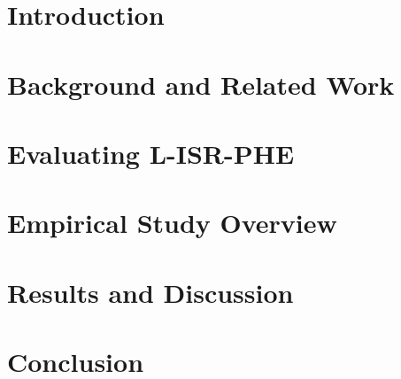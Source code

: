 \section{Introduction}
\label{sec:introduction}
%


\section{Background and Related Work}
\label{sec:related}


\section{Evaluating L-ISR-PHE}
\label{sec:methodology}



\section{Empirical Study Overview}


%
%
%
%


\section{Results and Discussion}


\section{Conclusion}

